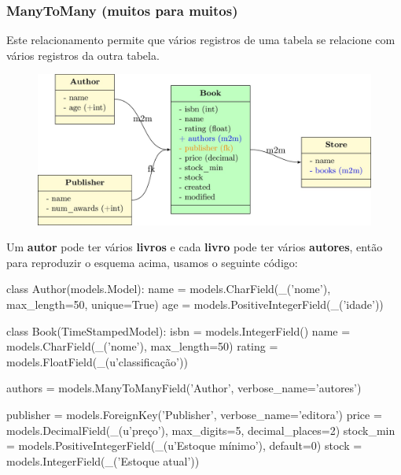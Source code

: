 \documentclass{beamer}
\begin{document}
{\begin{frame}[fragile]
\begin{pythoncode}
\end{pythoncode}

\end{frame}

\begin{frame}\frametitle{ManyToMany (muitos para muitos)}
	
Este relacionamento permite que vários registros de uma tabela se relacione com vários registros da outra tabela.

	\begin{figure}[h]
	  \centering
  		\includegraphics[width=.75\paperwidth]{img/03m2m.jpg}
	\end{figure}

Um \textbf{autor} pode ter vários \textbf{livros} e cada \textbf{livro} pode ter vários \textbf{autores}, então para reproduzir o esquema acima, usamos o seguinte código:
\end{frame}

\begin{frame}[fragile]

\begin{pythoncode}
class Author(models.Model):
    name = models.CharField(_('nome'), max_length=50, unique=True)
    age = models.PositiveIntegerField(_('idade'))


class Book(TimeStampedModel):
    isbn = models.IntegerField()
    name = models.CharField(_('nome'), max_length=50)
    rating = models.FloatField(_(u'classificação'))

    authors = models.ManyToManyField('Author',
                            verbose_name='autores')

    publisher = models.ForeignKey('Publisher', verbose_name='editora')
    price = models.DecimalField(_(u'preço'), max_digits=5, decimal_places=2)
    stock_min = models.PositiveIntegerField(_(u'Estoque mínimo'), default=0)
    stock = models.IntegerField(_('Estoque atual'))
\end{pythoncode}


\end{frame}}
\end{document}
